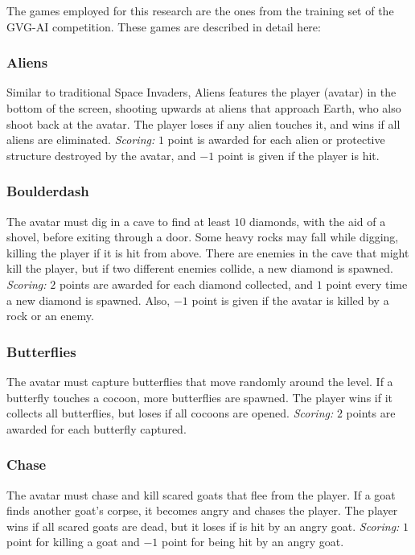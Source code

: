 \documentclass[conference]{IEEEtran}
\begin{document}
The games employed for this research are the ones from the training set of the GVG-AI competition. These games are described in detail here: 

\subsubsection{Aliens} Similar to traditional Space Invaders, Aliens features the player (avatar) in the bottom of the screen, shooting upwards at aliens that approach Earth, who also shoot back at the avatar. The player loses if any alien touches it, and wins if all aliens are eliminated. \textit{Scoring:} $1$ point is awarded for each alien or protective structure destroyed by the avatar, and $-1$ point is given if the player is hit. 

\subsubsection{Boulderdash} The avatar must dig in a cave to find at least $10$ diamonds, with the aid of a shovel, before exiting through a door. Some heavy rocks may fall while digging, killing the player if it is hit from above. There are enemies in the cave that might kill the player, but if two different enemies collide, a new diamond is spawned. \textit{Scoring:} $2$ points are awarded for each diamond collected, and $1$ point every time a new diamond is spawned. Also, $-1$ point is given if the avatar is killed by a rock or an enemy.

\subsubsection{Butterflies} The avatar must capture butterflies that move randomly around the level. If a butterfly touches a cocoon, more butterflies are spawned. The player wins if it collects all butterflies, but loses if all cocoons are opened. \textit{Scoring:} $2$ points are awarded for each butterfly captured. 

\subsubsection{Chase} The avatar must chase and kill scared goats that flee from the player. If a goat finds another goat's corpse, it becomes angry and chases the player. The player wins if all scared goats are dead, but it loses if is hit by an angry goat. \textit{Scoring:} $1$ point for killing a goat and $-1$ point for being hit by an angry goat.
\end{document}
